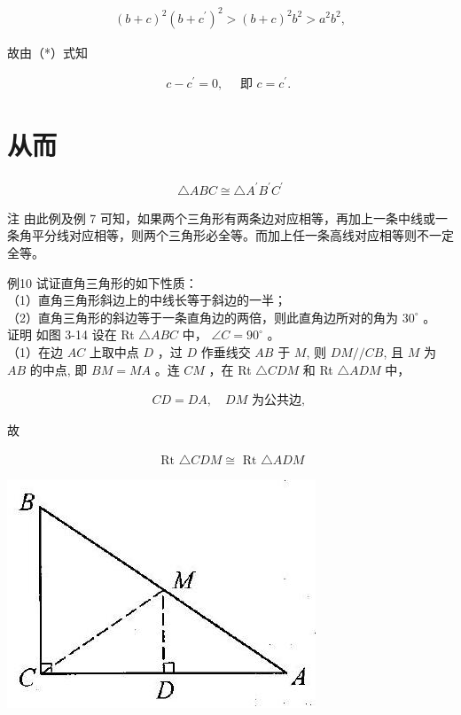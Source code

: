 \documentclass[10pt]{article}
\begin{document}
\begin{align*}
(b+c)^{2}\left(b+c^{\prime}\right)^{2}>(b+c)^{2} b^{2}>a^{2} b^{2},
\end{align*}

故由（*）式知

\begin{align*}
c-c^{\prime}=0, \quad \text { 即 } c=c^{\prime} \text {. }
\end{align*}

\section*{从而}
\begin{align*}
\triangle A B C \cong \triangle A^{\prime} B^{\prime} C^{\prime}
\end{align*}

注 由此例及例 7 可知，如果两个三角形有两条边对应相等，再加上一条中线或一条角平分线对应相等，则两个三角形必全等。而加上任一条高线对应相等则不一定全等。

例10 试证直角三角形的如下性质：\\
（1）直角三角形斜边上的中线长等于斜边的一半；\\
（2）直角三角形的斜边等于一条直角边的两倍，则此直角边所对的角为 $30^{\circ}$ 。\\
证明 如图 3-14 设在 Rt $\triangle A B C$ 中， $\angle C=90^{\circ}$ 。\\
（1）在边 $A C$ 上取中点 $D$ ，过 $D$ 作垂线交 $A B$ 于 $M$, 则 $D M / / C B$, 且 $M$ 为 $A B$ 的中点, 即 $B M=M A$ 。连 $C M$ ，在 Rt $\triangle C D M$ 和 Rt $\triangle A D M$ 中，

\begin{align*}
C D=D A, \quad D M \text { 为公共边, }
\end{align*}

故

\begin{align*}
\text { Rt } \triangle C D M \cong \text { Rt } \triangle A D M
\end{align*}

\begin{center}
\includegraphics[max width=\textwidth]{2024_10_30_2c8f45efd4a519b08e1ag-032}
\end{center}
\end{document}
